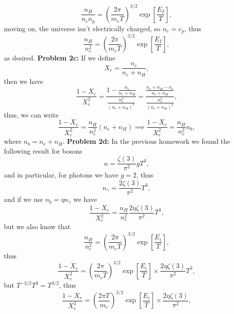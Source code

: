 \documentclass[11pt]{article}
\begin{document}
\begin{displaymath}
  \frac{n_H}{n_e n_p} = \left(\frac{2\pi }{m_e T}\right)^{3/2} \exp\left[ \frac{E_I}{T}\right],
\end{displaymath}
moving on, the universe isn't electrically charged, so $n_e=e_p$, thus
\begin{displaymath}
  \frac{n_H}{n_e^2} = \left(\frac{2\pi }{m_e T}\right)^{3/2} \exp\left[\frac{E_I}{T}\right],
\end{displaymath}
as desired.
\newline
\textbf{Problem 2c:} If we define
\begin{displaymath}
  X_e = \frac{n_e}{n_e+n_H}, 
\end{displaymath}
then we have
\begin{displaymath}
  \frac{1-X_e}{X_e^2} = \frac{1-\frac{n_e}{n_e+n_H}}{\frac{n_e^2}{\left(n_e+n_H\right)^2}} = \frac{\frac{n_e+n_H-n_e}{n_e+n_H}}{\frac{n_e^2}{\left(n_e+n_H\right)^2}},
\end{displaymath}
thus, we can write
\begin{displaymath}
\frac{1-X_e}{X_e^2} = \frac{n_H}{n_e^2}\left( n_e + n_H\right) \implies   \frac{1-X_e}{X_e^2} = \frac{n_H}{n_e^2}n_b,
\end{displaymath}
where $n_b = n_e + n_H$.
\newline
\textbf{Problem 2d:} In the previous homework we found the following result for bosons
\begin{displaymath}
  n = \frac{\zeta(3)}{\pi^2}gT^3,
\end{displaymath}
and in particular, for photons we have $g=2$, thus
\begin{displaymath}
  n_\gamma = \frac{2\zeta(3)}{\pi^2}T^3,
\end{displaymath}
and if we use $n_b = \eta n_\gamma$ we have
\begin{displaymath}
  \frac{1-X_e}{X_e^2} = \frac{n_H}{n_e^2}\frac{2\eta\zeta(3)}{\pi^2}T^3,
\end{displaymath}
but we also know that
\begin{displaymath}
  \frac{n_H}{n_e^2} = \left(\frac{2\pi }{m_e T}\right)^{3/2} \exp\left[\frac{E_i}{T}\right],
\end{displaymath}
thus
\begin{displaymath}
  \frac{1-X_e}{X_e^2} = \left(\frac{2\pi }{m_e T}\right)^{3/2} \exp\left[\frac{E_i}{T}\right]\times\frac{2\eta\zeta(3)}{\pi^2}T^3,
\end{displaymath}
but $T^{-3/2}T^3 = T^{3/2}$, thus
\begin{displaymath}
 \frac{1-X_e}{X_e^2} = \left(\frac{2\pi T}{m_e}\right)^{3/2} \exp\left[\frac{E_i}{T}\right]\times\frac{2\eta\zeta(3)}{\pi^2},
\end{displaymath}
\end{document}
